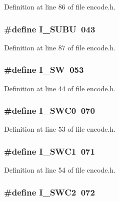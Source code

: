 Definition at line 86 of file encode.\+h.

\subsubsection[{I\+\_\+\+S\+U\+BU}]{\setlength{\rightskip}{0pt plus 5cm}\#define I\+\_\+\+S\+U\+BU~043}\label{encode_8h_ad43620e75a35844c3fd3e6b411b9077f}


Definition at line 87 of file encode.\+h.

\subsubsection[{I\+\_\+\+SW}]{\setlength{\rightskip}{0pt plus 5cm}\#define I\+\_\+\+SW~053}\label{encode_8h_a0ac94d0f0d4b081a37242d46d72de4c6}


Definition at line 44 of file encode.\+h.

\subsubsection[{I\+\_\+\+S\+W\+C0}]{\setlength{\rightskip}{0pt plus 5cm}\#define I\+\_\+\+S\+W\+C0~070}\label{encode_8h_a7b02533c243ac327afd8d12aea86d90e}


Definition at line 53 of file encode.\+h.

\subsubsection[{I\+\_\+\+S\+W\+C1}]{\setlength{\rightskip}{0pt plus 5cm}\#define I\+\_\+\+S\+W\+C1~071}\label{encode_8h_a89cc7cb3d5335a5fef72d313c20d3014}


Definition at line 54 of file encode.\+h.

\subsubsection[{I\+\_\+\+S\+W\+C2}]{\setlength{\rightskip}{0pt plus 5cm}\#define I\+\_\+\+S\+W\+C2~072}\label{encode_8h_af68c2ca4a58dab2c6a56dc5736c94a1a}


